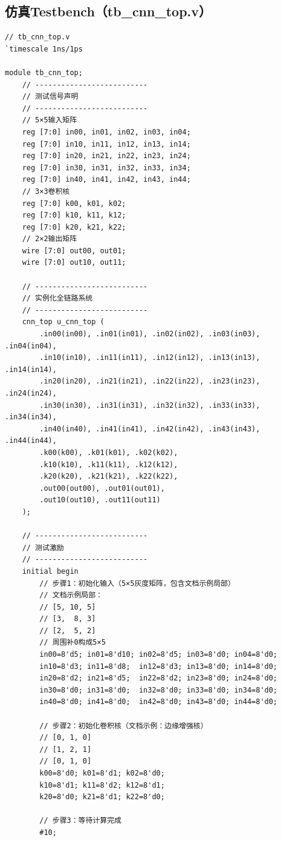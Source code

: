 \documentclass{ctexart}
\begin{document}
\subsection{仿真Testbench（tb\_cnn\_top.v）}
\begin{lstlisting}[style=verilog, caption=tb\_cnn\_top.v]
// tb_cnn_top.v
`timescale 1ns/1ps

module tb_cnn_top;
    // --------------------------
    // 测试信号声明
    // --------------------------
    // 5×5输入矩阵
    reg [7:0] in00, in01, in02, in03, in04;
    reg [7:0] in10, in11, in12, in13, in14;
    reg [7:0] in20, in21, in22, in23, in24;
    reg [7:0] in30, in31, in32, in33, in34;
    reg [7:0] in40, in41, in42, in43, in44;
    // 3×3卷积核
    reg [7:0] k00, k01, k02;
    reg [7:0] k10, k11, k12;
    reg [7:0] k20, k21, k22;
    // 2×2输出矩阵
    wire [7:0] out00, out01;
    wire [7:0] out10, out11;

    // --------------------------
    // 实例化全链路系统
    // --------------------------
    cnn_top u_cnn_top (
        .in00(in00), .in01(in01), .in02(in02), .in03(in03), .in04(in04),
        .in10(in10), .in11(in11), .in12(in12), .in13(in13), .in14(in14),
        .in20(in20), .in21(in21), .in22(in22), .in23(in23), .in24(in24),
        .in30(in30), .in31(in31), .in32(in32), .in33(in33), .in34(in34),
        .in40(in40), .in41(in41), .in42(in42), .in43(in43), .in44(in44),
        .k00(k00), .k01(k01), .k02(k02),
        .k10(k10), .k11(k11), .k12(k12),
        .k20(k20), .k21(k21), .k22(k22),
        .out00(out00), .out01(out01),
        .out10(out10), .out11(out11)
    );

    // --------------------------
    // 测试激励
    // --------------------------
    initial begin
        // 步骤1：初始化输入（5×5灰度矩阵，包含文档示例局部）
        // 文档示例局部：
        // [5, 10, 5]
        // [3,  8, 3]
        // [2,  5, 2]
        // 周围补0构成5×5
        in00=8'd5; in01=8'd10; in02=8'd5; in03=8'd0; in04=8'd0;
        in10=8'd3; in11=8'd8;  in12=8'd3; in13=8'd0; in14=8'd0;
        in20=8'd2; in21=8'd5;  in22=8'd2; in23=8'd0; in24=8'd0;
        in30=8'd0; in31=8'd0;  in32=8'd0; in33=8'd0; in34=8'd0;
        in40=8'd0; in41=8'd0;  in42=8'd0; in43=8'd0; in44=8'd0;

        // 步骤2：初始化卷积核（文档示例：边缘增强核）
        // [0, 1, 0]
        // [1, 2, 1]
        // [0, 1, 0]
        k00=8'd0; k01=8'd1; k02=8'd0;
        k10=8'd1; k11=8'd2; k12=8'd1;
        k20=8'd0; k21=8'd1; k22=8'd0;

        // 步骤3：等待计算完成
        #10;


\end{lstlisting}
\end{document}
